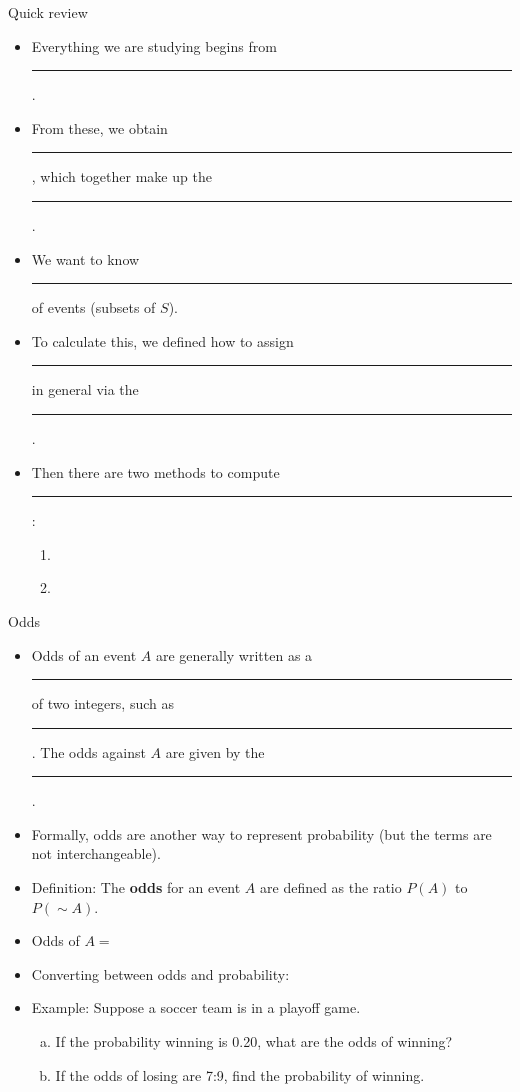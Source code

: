 \documentclass{article}
\newcommand{\blankul}[1]{\rule[-1.5mm]{#1}{0.15mm}}	%
\newcommand{\comp}[1]{{\sim}#1}		%
\begin{document}
Quick review\bigskip
\begin{itemize}
    \item Everything we are studying begins from \blankul{3cm}.
    \item[] From these, we obtain \blankul{2cm}, which together make up the \blankul{3cm}.
    \item We want to know \blankul{3cm} of events (subsets of $S$).
    \item[] To calculate this, we defined how to assign \blankul{3cm} in general via the \blankul{2cm}.
    \item Then there are two methods to compute \blankul{3cm}:\bigskip
    \begin{enumerate}
        \item \hspace{10pt}\\
        \item \hspace{10pt}
    \end{enumerate}
\end{itemize}\bigskip\bigskip

Odds\bigskip
\begin{itemize}
    \item Odds of an event $A$ are generally written as a \blankul{1.5cm} of two integers, such as \blankul{4cm}. The odds against $A$ are given by the \blankul{4cm}.
    \item[] Formally, odds are another way to represent probability (but the terms are  not interchangeable).\bigskip
    \item Definition: The \textbf{odds} for an event $A$ are defined as the ratio $P(A)$ to $P(\comp A)$.\\
    \item[] Odds of $A = $\\
    \item Converting between odds and probability:
    \item[] Example: Suppose a soccer team is in a playoff game.
        \begin{enumerate}[(a)]
        \item If the probability winning is 0.20, what are the odds of winning?\vspace{40pt}
        \item If the odds of losing are 7:9, find the probability of winning.\vspace{20pt}
    \end{enumerate}
\end{itemize}
\end{document}
